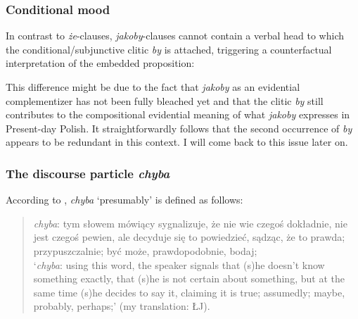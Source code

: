 \documentclass[output=paper]{langsci/langscibook}
\begin{document}
\subsubsection{Conditional mood}
In contrast to \emph{że}-clauses, \emph{jakoby}-clauses cannot contain a verbal head to which the conditional\slash subjunctive clitic \emph{by} is attached, triggering a counterfactual interpretation of the embedded proposition:

 \ea {}
\z\z
This difference might be due to the fact that \emph{jakoby} as an evidential complementizer has not been fully bleached yet and that the clitic \emph{by} still contributes to the compositional evidential meaning of what \emph{jakoby} expresses in Present-day Polish. It straightforwardly follows that the second occurrence of \emph{by} appears to be redundant in this context. I will come back to this issue later on.

\subsubsection{The discourse particle \textit{chyba}}
According to \textcite{SWJP1998}, \emph{chyba} `presumably' is defined as follows:

\begin{quote}
\textit{chyba}: tym słowem mówiący sygnalizuje, że nie wie czegoś dokładnie, nie jest czegoś pewien, ale decyduje się to powiedzieć, sądząc, że to prawda; przypuszczalnie; być może, prawdopodobnie, bodaj;\\ 
`\textit{chyba}: using this word, the speaker signals that (s)he doesn't know something exactly, that (s)he is not certain about something, but at the same time (s)he decides to say it, claiming it is true; assumedly; maybe, probably, perhaps;'  (my translation: ŁJ).  \newline \textcite[117]{SWJP1998}
\end{quote}
\end{document}
